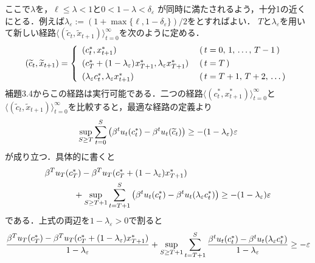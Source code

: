 \documentclass[a4paper,11pt]{jsarticle}
\DeclareRobustCommand{\lfrac}[2]{{\lower.4ex\hbox{\begingroup\ensuremath{#1}\endgroup}\over{\hspace{.2mm}#2\hspace{.2mm}}}}
\begin{document}
ここで$\lambda$を，$\ell \leq \lambda<1$と$0<1-\lambda<\delta_\varepsilon$
が同時に満たされるよう，十分1の近くにとる．例えば$\lambda_\varepsilon:=(1+\max\{\ell,1-\delta_\varepsilon\})/2$をとすればよい．
$T$と$\lambda_\varepsilon$を用いて新しい経路$\langle (\widetilde{c}_t, \widetilde{x}_{t+1})\rangle_{t=0}^\infty$を次のように定める．
\begin{align*}
	(\widetilde{c}_t,\widetilde{x}_{t+1})=
        	\left\{
                	\begin{array}{ll}
                        	(c_t^*,x_{t+1}^*)							&\;	(\,t=0,\,1,\,\ldots,\,T-1\,)\vspace{1.2mm}\\
                                (c_T^*+(1-\lambda_\varepsilon)\hspace{.2mm}x_{T+1}^*,\lambda_\varepsilon x_{T+1}^*)&\;	(\,t=T\,)\vspace{1.2mm}\\
                                (\lambda_\varepsilon c_t^*,\lambda_\varepsilon x_{t+1}^*)		&\;	(\,t=T+1,\,T+2,\,\ldots\,)
                        \end{array}
                \right.
\end{align*}
補題3.4からこの経路は実行可能である．二つの経路$\langle (c_t^*,x_{t+1}^*) \rangle_{t=0}^\infty$と$\langle (\widetilde{c}_t,\widetilde{x}_{t+1}) \rangle_{t=0}^\infty$を比較すると，最適な経路の定義より
\begin{align*}
	\sup_{S \geq T} \sum_{t=0}^S \left(\beta^t u_t(c_t^*)-\beta^t u_t(\widetilde{c}_t)\right) \geq -(1-\lambda_\varepsilon)\hspace{.2mm}\varepsilon
\end{align*}
が成り立つ．具体的に書くと
\begin{align*}
        &\beta^T u_T(c_T^*)-\beta^T u_T(c_T^*+(1-\lambda_\varepsilon)x_{T+1}^*)\\
			&\hspace*{12mm}+\sup_{S \geq T+1} \sum_{t=T+1}^S \left( \beta^t u_t(c_t^*)-\beta^t u_t(\lambda_\varepsilon c_t^*)\right)
			\geq -(1-\lambda_\varepsilon)\varepsilon
\end{align*}
である．上式の両辺を$1-\lambda_\varepsilon>0$で割ると
\begin{align*}
        \lfrac{\beta^T u_T(c_T^*)-\beta^T u_T(c_T^*+(1-\lambda_\varepsilon)x_{T+1}^*)}{1-\lambda_\varepsilon}+\sup_{S \geq T+1} \sum_{t=T+1}^S \lfrac{\beta^t u_t(c_t^*)-\beta^t u_t(\lambda_\varepsilon c_t^*)}{1-\lambda_\varepsilon}
			\geq -\varepsilon
\end{align*}
\end{document}
